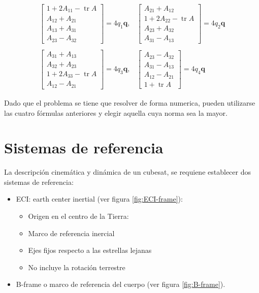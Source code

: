\begin{equation}
	\begin{array}{cc}
		\left[
		\begin{array}{c}
			1 + 2A_{11} - \operatorname{tr}A \\
			A_{12} + A_{21} \\
			A_{13} + A_{31} \\
			A_{23} - A_{32}
		\end{array}
		\right]
		= 4q_1 \mathbf{q}, &
		\left[
		\begin{array}{c}
			A_{21} + A_{12} \\
			1 + 2A_{22} - \operatorname{tr}A \\
			A_{23} + A_{32} \\
			A_{31} - A_{13}
		\end{array}
		\right]
		= 4q_2 \mathbf{q} \\
		\\
		\left[
		\begin{array}{c}
			A_{31} + A_{13} \\
			A_{32} + A_{23} \\
			1 + 2A_{33} - \operatorname{tr}A \\
			A_{12} - A_{21}
		\end{array}
		\right]
		= 4q_3 \mathbf{q}, &
		\left[
		\begin{array}{c}
			A_{23} - A_{32} \\
			A_{31} - A_{13} \\
			A_{12} - A_{21} \\
			1 + \operatorname{tr}A
		\end{array}
		\right]
		= 4q_4 \mathbf{q}
	\end{array}
\end{equation}

Dado que el problema se tiene que resolver de forma  numerica, pueden utilizarse las cuatro fórmulas anteriores y elegir aquella cuya norma sea la mayor. 
\section{Sistemas de referencia} 
La descripción  cinemática y dinámica de un cubesat, se requiene establecer dos sistemas de referencia: 
\begin{itemize}
	\item ECI: earth center inertial (ver figura \ref{fig:ECI-frame}): 
	\begin{itemize}
		\item Origen en el centro de la Tierra:
		\item Marco de referencia inercial
		\item Ejes fijos respecto a las estrellas lejanas
		\item No incluye la rotación terrestre
	\end{itemize}
	\item B-frame o marco de referencia del cuerpo (ver figura \ref{fig:B-frame}). 
\end{itemize}

